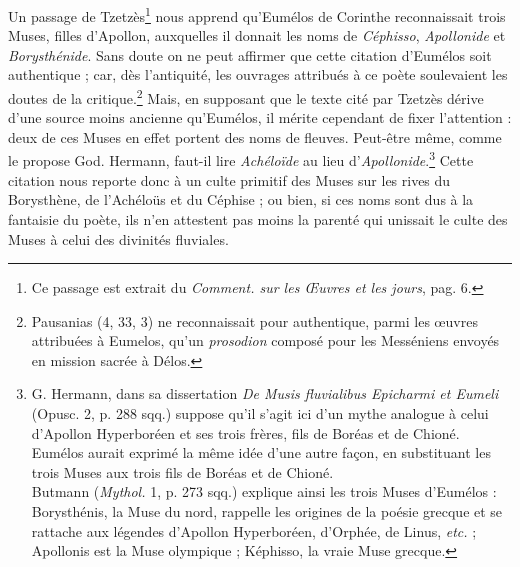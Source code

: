 \documentclass[a4paper, 11pt, oneside, polutonikogreek, french]{article}
\begin{document}
Un passage de Tzetzès\footnote{Ce passage est extrait du \emph{Comment. sur les Œuvres et les jours}, pag. 6.} nous apprend qu'Eumélos de Corinthe reconnaissait trois Muses, filles d'Apollon, auxquelles il donnait les noms de \emph{Céphisso}, \emph{Apollonide} et \emph{Borysthénide}. Sans doute on ne peut affirmer que cette citation d'Eumélos soit authentique ; car, dès l'antiquité, les ouvrages attribués à ce poète soulevaient les doutes de la critique.\footnote{Pausanias (4, 33, 3) ne reconnaissait pour authentique, parmi les œuvres attribuées à Eumelos, qu'un \emph{prosodion} composé pour les Messéniens envoyés en mission sacrée à Délos.} Mais, en supposant que le texte cité par Tzetzès dérive d'une source moins ancienne qu'Eumélos, il mérite cependant de fixer l'attention : deux de ces Muses en effet portent des noms de fleuves. Peut-être même, comme le propose God. Hermann, faut-il lire \emph{Achéloïde} au lieu d'\emph{Apollonide}.\footnote{G. Hermann, dans sa dissertation \emph{De Musis fluvialibus Epicharmi et Eumeli} (Opusc. 2, p. 288 sqq.) suppose qu'il s'agit ici d'un mythe analogue à celui d'Apollon Hyperboréen et ses trois frères, fils de Boréas et de Chioné. Eumélos aurait exprimé la même idée d'une autre façon, en substituant les trois Muses aux trois fils de Boréas et de Chioné.\\\hspace*{5mm}Butmann (\emph{Mythol.} 1, p. 273 sqq.) explique ainsi les trois Muses d'Eumélos : Borysthénis, la Muse du nord, rappelle les origines de la poésie grecque et se rattache aux légendes d'Apollon Hyperboréen, d'Orphée, de Linus, \emph{etc.} ; Apollonis est la Muse olympique ; Képhisso, la vraie Muse grecque.} Cette citation nous reporte donc à un culte primitif des Muses sur les rives du Borysthène, de l'Achéloüs et du Céphise ; ou bien, si ces noms sont dus à la fantaisie du poète, ils n'en attestent pas moins la parenté qui unissait le culte des Muses à celui des divinités fluviales.
\end{document}
